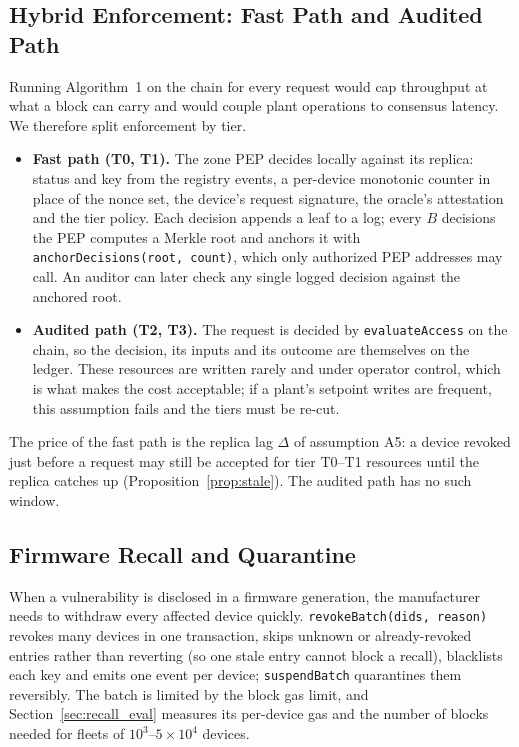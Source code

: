 \subsection{Hybrid Enforcement: Fast Path and Audited Path}\label{sec:hybrid}
Running Algorithm~1 on the chain for every request would cap throughput at what a block can carry and would couple plant operations to consensus latency. We therefore split enforcement by tier.
\begin{itemize}[leftmargin=1.1em,itemsep=0pt,topsep=1pt]
  \item \textbf{Fast path (T0, T1).} The zone PEP decides locally against its replica: status and key from the registry events, a per-device monotonic counter in place of the nonce set, the device's request signature, the oracle's attestation and the tier policy. Each decision appends a leaf to a log; every $B$ decisions the PEP computes a Merkle root and anchors it with \texttt{anchorDecisions(root, count)}, which only authorized PEP addresses may call. An auditor can later check any single logged decision against the anchored root.
  \item \textbf{Audited path (T2, T3).} The request is decided by \texttt{evaluateAccess} on the chain, so the decision, its inputs and its outcome are themselves on the ledger. These resources are written rarely and under operator control, which is what makes the cost acceptable; if a plant's setpoint writes are frequent, this assumption fails and the tiers must be re-cut.
\end{itemize}
The price of the fast path is the replica lag $\Delta$ of assumption A5: a device revoked just before a request may still be accepted for tier T0--T1 resources until the replica catches up (Proposition~\ref{prop:stale}). The audited path has no such window.

\subsection{Firmware Recall and Quarantine}\label{sec:recall}
When a vulnerability is disclosed in a firmware generation, the manufacturer needs to withdraw every affected device quickly. \texttt{revokeBatch(dids, reason)} revokes many devices in one transaction, skips unknown or already-revoked entries rather than reverting (so one stale entry cannot block a recall), blacklists each key and emits one event per device; \texttt{suspendBatch} quarantines them reversibly. The batch is limited by the block gas limit, and Section~\ref{sec:recall_eval} measures its per-device gas and the number of blocks needed for fleets of $10^3$--$5\times10^4$ devices.

